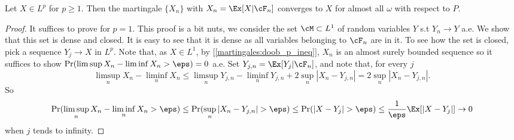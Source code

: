 \begin{theorem}
	Let $X \in L^p$ for $p \geq 1$. Then the martingale $\{X_n\}$ with
	$X_n = \Ex[X|\cF_n]$ converges to $X$ for
	almost all $\omega$ with respect to $P$.
\end{theorem}
\begin{proof}
	It suffices to prove for $p = 1$. This proof is a bit nuts, we
	consider the set $\cM \subset L^1$
	of random variables $Y$ s.t $Y_n \to Y$ a.e. We show that this set
	is dense and closed.
	It is easy to see that it is dense as all variables belonging to
	$\cF_n$ are in it.
	To see how the set is closed, pick a sequence $Y_j \to X$ in $L^p$.
	Note that, as $X \in L^1$, by [\ref{martingales:doob_p_ineq}], $X_n$
	is an almost surely bounded
	sequence so it suffices to show $\Pr(\limsup{X_n} - \liminf{X_n} >
	\eps) = 0$ a.e. Set $Y_{j,n} = \Ex[Y_j | \cF_n]$,
	and note that, for every $j$
	\[
		\limsup_n{X_n} - \liminf_n{X_n} \leq \limsup_n{Y_{j,n}} -
		\liminf_n{Y_{j,n}} + 2\sup_n{|X_n - Y_{j,n}|} = 2\sup_n{|X_n - Y_{j,n}|}.
	\]
	So
	\[
		\Pr(\limsup_n{X_n} - \liminf_n{X_n} > \eps) \leq \Pr(\sup_n |X_n -
		Y_{j,n}| > \eps) \leq \Pr(|X - Y_j| > \eps) \leq
		\frac{1}{\eps}\Ex[|X - Y_j|] \to 0
	\]
	when $j$ tends to infinity.
\end{proof}

\begin{theorem}

\end{theorem}
